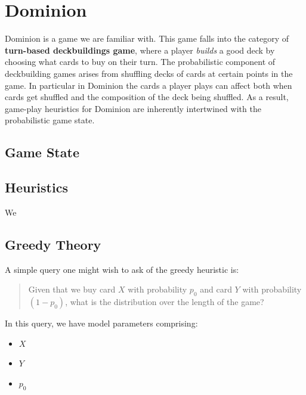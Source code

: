 
\section{Dominion} \label{sec:dom}

Dominion is a game we are familiar with. This game falls into the category of
{\bf turn-based
deckbuildings game}, where a player \emph{builds} a good deck by choosing what
cards to buy on their turn. The probabilistic component of deckbuilding games
arises from shuffling decks of cards at certain points in the game. In particular
in Dominion the cards a player plays can affect both when cards get shuffled
and the composition of the deck being shuffled. As a result, game-play heuristics
for Dominion are inherently intertwined with the probabilistic game state.

\subsection{Game State}

\subsection{Heuristics} \label{sec:dom:heuristics}
We

\subsection{Greedy Theory}
A simple query one might wish to ask of the greedy heuristic is:

\begin{quote} \label{quote:dominion-query}
Given that we buy card $X$ with probability $p_0$ and card $Y$ with
probability $(1 - p_0)$, what is the distribution over the length of
the game?
\end{quote}

In this query, we have model parameters comprising:

\begin{itemize}
\item $X$  
\item $Y$  
\item $p_0$ 
\end{itemize}

